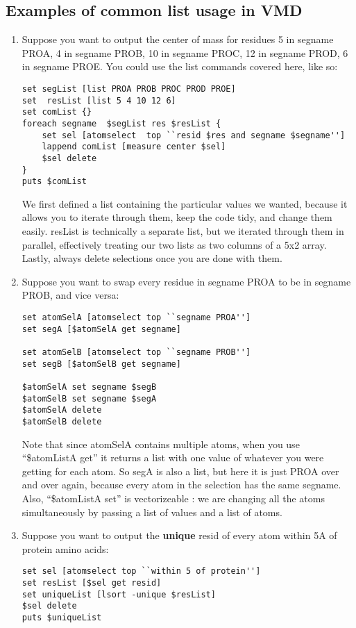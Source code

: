 \documentclass[letter,11pt]{article}
\begin{document}
\subsection{Examples of common list usage in VMD} 
\begin{enumerate}
\item Suppose you want to output the center of mass for residues 5 in segname PROA, 4 in segname PROB, 10 in segname PROC, 12 in segname PROD, 6 in segname PROE.  You could use the list commands covered here, like so: 
\begin{lstlisting}
set segList [list PROA PROB PROC PROD PROE]  
set  resList [list 5 4 10 12 6]  
set comList {}
foreach segname  $segList res $resList {
	set sel [atomselect  top ``resid $res and segname $segname'']
	lappend comList [measure center $sel]
	$sel delete 
}
puts $comList
\end{lstlisting}

We first defined a list containing the particular values we wanted,  because it allows you to iterate through them, keep the code tidy, and  change  them easily. resList is technically  a separate list, but we iterated through them in  parallel,  effectively treating our two lists as two columns  of a 5x2 array.  Lastly, always delete selections once you are done with them. 

\item Suppose you want to swap every residue in segname PROA  to be in segname PROB, and vice versa: 
\begin{lstlisting}
set atomSelA [atomselect top ``segname PROA'']
set segA [$atomSelA get segname]         

set atomSelB [atomselect top ``segname PROB'']  
set segB [$atomSelB get segname]  

$atomSelA set segname $segB 
$atomSelB set segname $segA
$atomSelA delete
$atomSelB delete 
\end{lstlisting}

Note that since atomSelA contains multiple atoms, when you use  
``\$atomListA get'' it returns a list with one  value of whatever you were getting for each atom. So segA is also a list, but here it is just PROA over and over again, because every atom in the selection has the same segname.  Also,  ``\$atomListA set''  is  vectorizeable : we are changing all the atoms  simultaneously by passing a  list of values and a list of atoms.
\item Suppose you want to output  the {\bf unique} resid of every atom within  5A of protein amino acids:
\begin{lstlisting}
set sel [atomselect top ``within 5 of protein'']
set resList [$sel get resid]
set uniqueList [lsort -unique $resList]
$sel delete
puts $uniqueList 
\end{lstlisting}
\end{enumerate}
\end{document}
